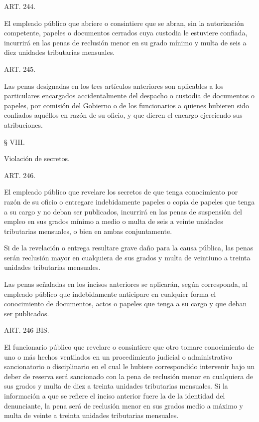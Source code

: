     ART. 244.

    El empleado público que abriere o consintiere que se abran, sin la autorización competente, papeles o documentos cerrados cuya custodia le estuviere confiada, incurrirá en las penas de reclusión menor en su grado mínimo y multa de seis a diez unidades tributarias mensuales.








    ART. 245.

    Las penas designadas en los tres artículos anteriores son aplicables a los particulares encargados accidentalmente del despacho o custodia de documentos o papeles, por comisión del Gobierno o de los funcionarios a quienes hubieren sido confiados aquéllos en razón de su oficio, y que dieren el encargo ejerciendo sus atribuciones.


    § VIII.

    Violación de secretos.





    ART. 246.

    El empleado público que revelare los secretos de que tenga conocimiento por razón de su oficio o entregare indebidamente papeles o copia de papeles que tenga a su cargo y no deban ser publicados, incurrirá en las penas de suspensión del empleo en sus grados mínimo a medio o multa de seis a veinte unidades tributarias mensuales, o bien en ambas conjuntamente.

    Si de la revelación o entrega resultare grave daño para la causa pública, las penas serán reclusión mayor en cualquiera de sus grados y multa de veintiuno a treinta unidades tributarias mensuales.

    Las penas señaladas en los incisos anteriores se aplicarán, según corresponda, al empleado público que indebidamente anticipare en cualquier forma el conocimiento de documentos, actos o papeles que tenga a su cargo y que deban ser publicados.

    ART. 246 BIS.

    El funcionario público que revelare o consintiere que otro tomare conocimiento de uno o más hechos ventilados en un procedimiento judicial o administrativo sancionatorio o disciplinario en el cual le hubiere correspondido intervenir bajo un deber de reserva será sancionado con la pena de reclusión menor en cualquiera de sus grados y multa de diez a treinta unidades tributarias mensuales.
    Si la información a que se refiere el inciso anterior fuere la de la identidad del denunciante, la pena será de reclusión menor en sus grados medio a máximo y multa de veinte a treinta unidades tributarias mensuales.



